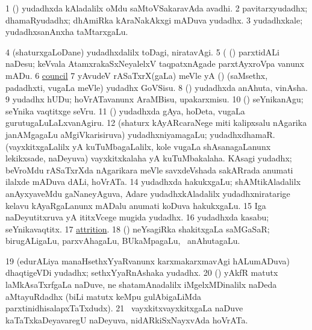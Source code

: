 \noindent 
\gl{\pagu}
\expl{}
\bmng
\bnum
\num{1}  (\AmA) yudadhxda kAladalilx oMdu saMtoVSakaravAda avadhi. 
\num{2}  pavitarxyudadhx; dhamaRyudadhx; dhAmiRka kAraNakAkxgi mADuva yudadhx. 
\num{3}  yudadhxkale; yudadhxsanAnxha taMtarxgaLu. 
\num{4}  (shaturxgaLoDane) yudadhxdalilx toDagi, niratavAgi. 
\num{5}  (  (\rUpa) parxtidALi naDesu; keVvala AtamxrakaSxNeyalelxV taqpatxnAgade parxtAyxroVpa \mo vanunx mADu. 
\num{6} \hyperref{kandict_c.pdf}{C}{council pagu(3)}{council}  
\num{7}  yAvudeV rASaTxrX(gaLa) meVle yA (\rUpa) (saMsethx, padadhxti, \mo vugaLa meVle) yudadhx GoVSisu. 
\num{8}  (\kAparx) yudadhxda anAhuta, vinAsha. 
\num{9}  yudadhx hUDu; hoVrATavanunx AraMBisu, upakarxmisu. 
\num{10}  (\pArxparx) seYnikanAgu; seYnika vaqtitxge seVru. 
\num{11}  (\AmA) yudadhxda gAya, hoDeta, \mo vugaLa gurutugaLuLaLxvanAgiru. 
\num{12}  (shaturx kAyARcaraNege miti kalipxsalu nAgarika janAMgagaLu aMgiVkarisiruva) yudadhxniyamagaLu; yudadhxdhamaR. 
  
\banum
{} (vayxkitxgaLalilx yA kuTuMbagaLalilx, kole \mo vugaLa shAsanagaLanunx lekikxsade, naDeyuva) vayxkitxkalaha yA kuTuMbakalaha. 
 KAsagi yudadhx; beVroMdu rASaTxrXda nAgarikara meVle savxdeVshada sakARrada anumati ilalxde mADuva dALi, hoVrATa. 
\eanum
\numie
\num{14}  yudadhxda hakukxgaLu; shAMtikAladalilx anAyxyaveMdu gaNaneyAguva, Adare yudadhxkAladalilx yudadhxniratarige kelavu kAyaRgaLanunx mADalu anumati koDuva hakukxgaLu. 
\num{15}  Iga naDeyutitxruva yA ititxVcege mugida yudadhx. 
\num{16}  yudadhxda kasabu; seYnikavaqtitx. 
\num{17}  \hyperref{kandict_a.pdf}{A}{attrition pagu}{attrition}. 
\num{18}  (\kAparx) neYsagiRka shakitxgaLa saMGaSaR; birugALigaLu, parxvAhagaLu, BUkaMpagaLu, \mo\ anAhutagaLu. 
\num{19}  (edurALiya manaHsethxYyaRvanunx karxmakarxmavAgi hALumADuva) dhaqtigeVDi yudadhx; sethxYyaRnAshaka yudadhx. 
\num{20}  (\ca) yAkfR matutx laMkAsaTxrfgaLa naDuve, ne shatamAnadalilx iMgelxMDinalilx naDeda aMtayuRdadhx (biLi matutx keMpu gulAbigaLiMda parxtinidhisalapxTaTxdudx). 
\num{21}  \kanmu\ vayxkitxvayxkitxgaLa naDuve kaTaTxkaDeyavaregU naDeyuva, nidARkiSxNayxvAda hoVrATa. 
\enum
\emng
\eentry

